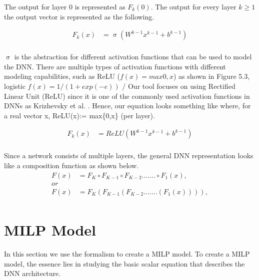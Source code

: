 The output for layer 0 is represented as $F_k(0)$.
The output for every layer $k \geq 1$ the output vector is represented as  the following. 

\begin{equation}
\begin{aligned}
F_k(x) &= \upsigma(W^{k-1}x^{k-1} + b^{k-1}) \\
\end{aligned}
\end{equation}

$\upsigma$ is the abstraction for different activation functions that can be used to model the DNN. 
There are multiple types of activation functions with different modeling capabilities, such as ReLU ($f(x) = max {0,x}$) as shown in Figure 5.3, logistic $f(x)=1/(1+ exp(-e))$
/
Our tool focuses on using Rectified Linear Unit (ReLU) since it is one of the commonly used activation functions in \ac{DNN}s as Krizhevsky et al. \cite{10.1145/3065386}. 
Hence, our equation looks something like where, for a real vector x, ReLU(x):= max\{0,x\} (per layer).

\begin{equation}
\begin{aligned}
F_k(x) &= ReLU(W^{k-1}x^{k-1} + b^{k-1}) \\
\end{aligned}
\end{equation}

Since a network consists of multiple layers, the general \ac{DNN} representation looks like a composition function as shown below. 
\begin{equation}
	\begin{aligned}
	F(x) &= F_K \circ F_{K-1} \circ F_{K-2} ....... \circ F_1(x),    \\
	or \\
	F(x) &= F_K ( F_{K-1}( F_{K-2} .......  (F_1(x)))),    \\
	\end{aligned}
\end{equation}


\section{MILP Model}
In this section we use the formalism to create a \ac{MILP} model. 
To create a \ac{MILP} model, the essence lies in studying the basic scalar equation that describes the \ac{DNN} architecture. 

